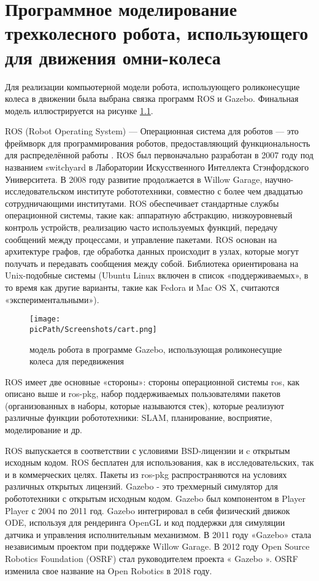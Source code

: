 \documentclass[oneside,final,14pt]{extreport}
\newcommand{\picPath}{img}
\begin{document}
\chapter{Программное моделирование трехколесного робота, использующего для движения омни-колеса }
Для реализации компьютерной модели робота, использующего роликонесущие колеса в движении была выбрана связка программ ROS и Gazebo. Финальная модель иллюстрируется на рисунке \ref{Figure:cartGazebo}.

ROS (Robot Operating System) — Операционная система для роботов — это фреймворк для программирования роботов, предоставляющий функциональность для распределённой работы \cite{Src:RosBook}. ROS был первоначально разработан в 2007 году под названием switchyard в Лаборатории Искусственного Интеллекта Стэнфордского Университета. В 2008 году развитие продолжается в Willow Garage, научно-исследовательском институте робототехники, совместно с более чем двадцатью сотрудничающими институтами. 
ROS обеспечивает стандартные службы операционной системы, такие как: аппаратную абстракцию, низкоуровневый контроль устройств, реализацию часто используемых функций, передачу сообщений между процессами, и управление пакетами. ROS основан на архитектуре графов, где обработка данных происходит в узлах, которые могут получать и передавать сообщения между собой. Библиотека ориентирована на Unix-подобные системы (Ubuntu Linux включен в список «поддерживаемых», в то время как другие варианты, такие как Fedora и Mac OS X, считаются «экспериментальными»).

\begin{figure}[H]
\begin{center}
\texttt{[image: \\picPath/Screenshots/cart.png]}
\end{center}
  \caption{ модель робота в программе Gazebo, использующая роликонесущие колеса для передвижения}
  \label{Figure:cartGazebo}
\end{figure}

ROS имеет две основные «стороны»: стороны операционной системы ros, как описано выше и ros-pkg, набор поддерживаемых пользователями пакетов (организованных в наборы, которые называются стек), которые реализуют различные функции робототехники: SLAM, планирование, восприятие, моделирование и др.

ROS выпускается в соответствии с условиями BSD-лицензии и c открытым исходным кодом. ROS бесплатен для использования, как в исследовательских, так и в коммерческих целях. Пакеты из ros-pkg распространяются на условиях различных открытых лицензий.
Gazebo - это трехмерный симулятор для робототехники с открытым исходным кодом. Gazebo был компонентом в Player Player с 2004 по 2011 год. Gazebo интегрировал в себя физический движок ODE, используя для рендеринга OpenGL и код поддержки для симуляции датчика и управления исполнительным механизмом. В 2011 году «Gazebo» стала независимым проектом при поддержке Willow Garage. В 2012 году Open Source Robotics Foundation (OSRF) стал руководителем проекта « Gazebo ». OSRF изменила свое название на Open Robotics в 2018 году. 
\end{document}
